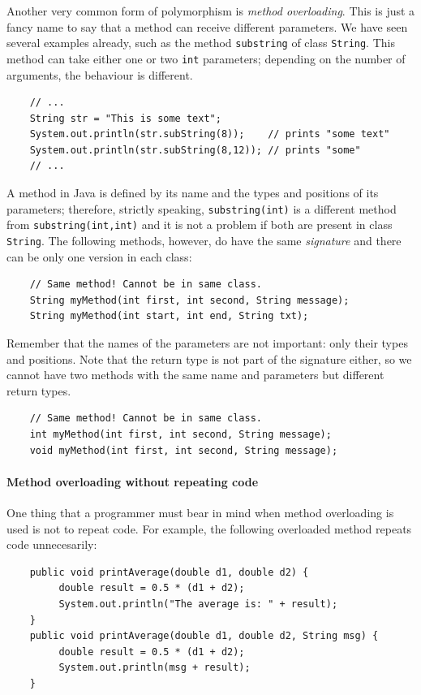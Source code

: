 Another very common form of polymorphism is \emph{method
  overloading}. This is just a fancy name to say that a method can
receive different parameters. We have seen several examples already,
such as the method \verb+substring+ of class \verb+String+. This
method can take either one or two \verb+int+ parameters; depending on
the number of arguments, the behaviour is different. 

\begin{verbatim}
    // ...
    String str = "This is some text";
    System.out.println(str.subString(8));    // prints "some text"
    System.out.println(str.subString(8,12)); // prints "some"
    // ...
\end{verbatim}

A method in Java is defined by its name and the types and positions of
its parameters; therefore, strictly speaking, \verb+substring(int)+ is
a different method from \verb+substring(int,int)+ and it is not a
problem if both are present in class \verb+String+. The following
methods, however, do have the same \emph{signature} and there can be
only one version in each class: 

\begin{verbatim}
    // Same method! Cannot be in same class.
    String myMethod(int first, int second, String message);
    String myMethod(int start, int end, String txt);
\end{verbatim}

Remember that the names of the parameters are not important: only their types and
positions. Note that the return type is not part of the signature
either, so we cannot have two methods with the same name and
parameters but different return types. 

\begin{verbatim}
    // Same method! Cannot be in same class.
    int myMethod(int first, int second, String message);
    void myMethod(int first, int second, String message);
\end{verbatim}

\paragraph{Method overloading without repeating code}
\label{sec:meth-overl-with}

One thing that a programmer must bear in mind when method overloading
is used is not to repeat code. For example, the following overloaded
method repeats code unnecesarily: 

\begin{verbatim}
    public void printAverage(double d1, double d2) {
         double result = 0.5 * (d1 + d2);
         System.out.println("The average is: " + result);
    }
    public void printAverage(double d1, double d2, String msg) {
         double result = 0.5 * (d1 + d2);
         System.out.println(msg + result);
    }
\end{verbatim}

